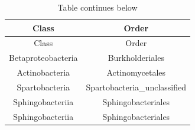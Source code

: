 \documentclass[]{article}
\begin{document}
\begin{longtable}[]{@{}cc@{}}
\caption{Table continues below}\tabularnewline
\toprule
\begin{minipage}[b]{0.38\columnwidth}\centering\strut
Class\strut
\end{minipage} & \begin{minipage}[b]{0.38\columnwidth}\centering\strut
Order\strut
\end{minipage}\tabularnewline
\midrule
\endfirsthead
\toprule
\begin{minipage}[b]{0.38\columnwidth}\centering\strut
Class\strut
\end{minipage} & \begin{minipage}[b]{0.38\columnwidth}\centering\strut
Order\strut
\end{minipage}\tabularnewline
\midrule
\endhead
\begin{minipage}[t]{0.38\columnwidth}\centering\strut
Betaproteobacteria\strut
\end{minipage} & \begin{minipage}[t]{0.38\columnwidth}\centering\strut
Burkholderiales\strut
\end{minipage}\tabularnewline
\begin{minipage}[t]{0.38\columnwidth}\centering\strut
Actinobacteria\strut
\end{minipage} & \begin{minipage}[t]{0.38\columnwidth}\centering\strut
Actinomycetales\strut
\end{minipage}\tabularnewline
\begin{minipage}[t]{0.38\columnwidth}\centering\strut
Spartobacteria\strut
\end{minipage} & \begin{minipage}[t]{0.38\columnwidth}\centering\strut
Spartobacteria\_unclassified\strut
\end{minipage}\tabularnewline
\begin{minipage}[t]{0.38\columnwidth}\centering\strut
Sphingobacteriia\strut
\end{minipage} & \begin{minipage}[t]{0.38\columnwidth}\centering\strut
Sphingobacteriales\strut
\end{minipage}\tabularnewline
\begin{minipage}[t]{0.38\columnwidth}\centering\strut
Sphingobacteriia\strut
\end{minipage} & \begin{minipage}[t]{0.38\columnwidth}\centering\strut
Sphingobacteriales\strut

\end{minipage}
\end{longtable}
\end{document}
